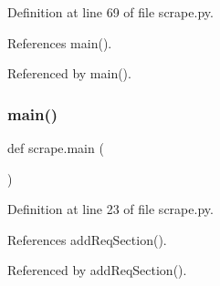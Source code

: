 Definition at line 69 of file scrape.\+py.



References main().



Referenced by main().

\mbox{\label{namespacescrape_a5653dd5601f9b92af6a260a7fab1ff43}} 
\subsubsection{\texorpdfstring{main()}{main()}}
{\footnotesize\ttfamily def scrape.\+main (\begin{DoxyParamCaption}{ }\end{DoxyParamCaption})}



Definition at line 23 of file scrape.\+py.



References add\+Req\+Section().



Referenced by add\+Req\+Section().

